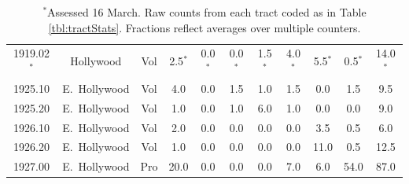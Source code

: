 \documentclass[11pt,twocolumn]{article}
\begin{document}
\begin{table}[t]
\begin{tabular}{ccccccccccc}
1919.02$^{\ast}$ & Hollywood & Vol & 2.5$^{\ast}$ &  0.0$^{\ast}$ &  0.0$^{\ast}$ &  1.5$^{\ast}$ &  4.0$^{\ast}$ &  5.5$^{\ast}$ &  0.5$^{\ast}$ &  14.0$^{\ast}$ \\
1925.10 & E.~Hollywood & Vol &  4.0 &  0.0 &  1.5 &  1.0 &  1.5 &  0.0 &  1.5 &   9.5 \\
1925.20 & E.~Hollywood & Vol &  1.0 &  0.0 &  1.0 &  6.0 &  1.0 &  0.0 &  0.0 &   9.0 \\
1926.10 & E.~Hollywood & Vol &  2.0 &  0.0 &  0.0 &  0.0 &  0.0 &  3.5 &  0.5 &   6.0 \\
1926.20 & E.~Hollywood & Vol &  1.0 &  0.0 &  0.0 &  0.0 &  0.0 & 11.0 &  0.5 &  12.5 \\
1927.00 & E.~Hollywood & Pro & 20.0 &  0.0 &  0.0 &  0.0 &  7.0 &  6.0 & 54.0 &  87.0 \\
\bottomrule
\end{tabular}
\caption*{$^{\ast}$Assessed 16 March. Raw counts from each tract coded as in Table \ref{tbl:tractStats}. 
		Fractions reflect averages over multiple counters.}
\label{tbl:allCount}
\end{table}
\end{document}
